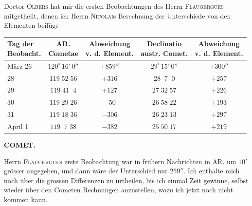 \par\indent Doctor \textsc{Olbers} hat mir die ersten Beobachtungen des Herrn \textsc{Flaugergues} mitgetheilt, denen ich Herrn \textsc{Nicolai}s Berechnung der Unterschiede von den Elementen beifüge

\begin{center}\fontsize{9}{11}\selectfont\setlength{\tabcolsep}{3pt}\renewcommand{\arraystretch}{1.15}\begin{tabular}{l|c|c|c|c}
\shortstack{Tag der\\Beobacht.} & \shortstack{AR.\\Cometae} & \shortstack{Abweichung\\v. d. Element.} & \shortstack{Declinatio\\austr. Comet.} & \shortstack{Abweichung\\v. d. Element.}\\\hline
März 26 & $120^\circ\,16'\,0''$ & $+859''$ & $29^\circ\,15'\,0''$ & $+300''$\\
28 & $119\;52\;56$ & $+316$ & $28\;\;7\;\;0$ & $+257$\\
29 & $119\;41\;\;4$ & $+127$ & $27\;32\;57$ & $+226$\\
30 & $119\;29\;26$ & $-50$ & $26\;58\;22$ & $+193$\\
31 & $119\;18\;36$ & $-306$ & $26\;23\;13$ & $+297$\\
April 1 & $119\;\;7\;38$ & $-382$ & $25\;50\;17$ & $+219$\\
\end{tabular}\end{center}

\clearpage
\thispagestyle{empty}
\noindent{}%
%
\parbox[t]{\dimexpr\linewidth-24mm\relax}{\centering\footnotesize\bfseries COMET.\par}%
\makebox[12mm][r]{}\par\nobreak\medskip
\par\indent Herrn \textsc{Flaugergues} erste Beobachtung war in frühern Nachrichten in AR. um $10'$ grösser angegeben, und dann wäre der Unterschied nur $259''$. Ich enthalte mich noch über die grossen Differenzen zu urtheilen, bis ich einmal Zeit gewinne, selbst wieder über den Cometen Rechnungen anzustellen, wozu ich jetzt noch nicht kommen kann.


